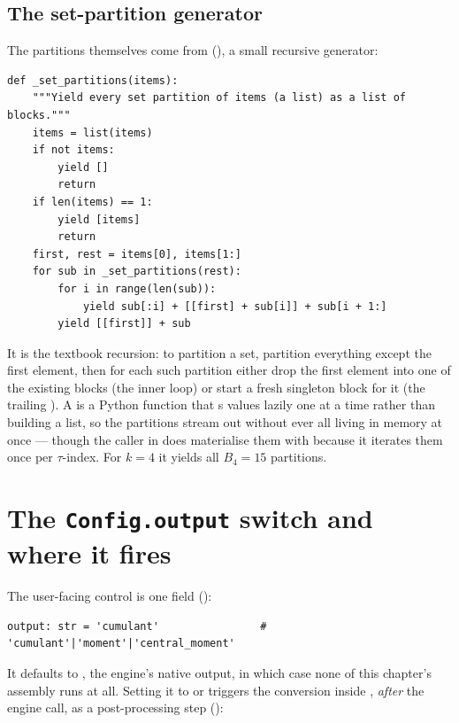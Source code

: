 \subsection{The set-partition generator}\label{sec:setpart-gen}

The partitions themselves come from 
(), a small recursive generator:

\begin{lstlisting}
def _set_partitions(items):
    """Yield every set partition of items (a list) as a list of blocks."""
    items = list(items)
    if not items:
        yield []
        return
    if len(items) == 1:
        yield [items]
        return
    first, rest = items[0], items[1:]
    for sub in _set_partitions(rest):
        for i in range(len(sub)):
            yield sub[:i] + [[first] + sub[i]] + sub[i + 1:]
        yield [[first]] + sub
\end{lstlisting}

It is the textbook recursion: to partition a set, partition everything except the
first element, then for each such partition either drop the first element into one
of the existing blocks (the inner  loop) or start a fresh singleton
block for it (the trailing ). A  is a Python function
that s values lazily one at a time rather than building a list, so the
partitions stream out without ever all living in memory at once --- though the
caller in  does materialise them with
 because it iterates them once per $\tau$-index. For $k=4$ it
yields all $B_4=15$ partitions.

\section{The \texttt{Config.output} switch and where it fires}\label{sec:moment-run}

The user-facing control is one  field
():

\begin{lstlisting}
output: str = 'cumulant'                # 'cumulant'|'moment'|'central_moment'
\end{lstlisting}

It defaults to , the engine's native output, in which case none
of this chapter's assembly runs at all. Setting it to  or
 triggers the conversion inside , \emph{after}
the engine call, as a post-processing step ():

